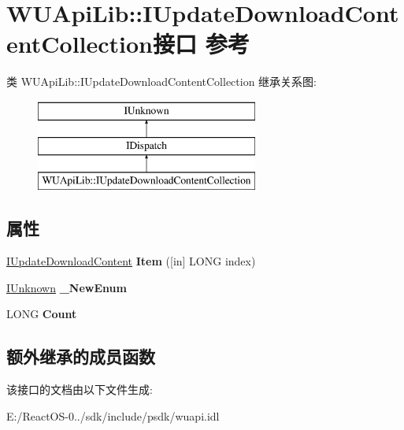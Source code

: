 \hypertarget{interface_w_u_api_lib_1_1_i_update_download_content_collection}{}\section{W\+U\+Api\+Lib\+:\+:I\+Update\+Download\+Content\+Collection接口 参考}
\label{interface_w_u_api_lib_1_1_i_update_download_content_collection}
类 W\+U\+Api\+Lib\+:\+:I\+Update\+Download\+Content\+Collection 继承关系图\+:\begin{figure}[H]
\begin{center}
\leavevmode
\includegraphics[height=3.000000cm]{interface_w_u_api_lib_1_1_i_update_download_content_collection}
\end{center}
\end{figure}
\subsection*{属性}
\begin{DoxyCompactItemize}
\item 
\mbox{\label{interface_w_u_api_lib_1_1_i_update_download_content_collection_a3d59c7eb3649060adbc671676b8494d0}} 
\hyperlink{interface_w_u_api_lib_1_1_i_update_download_content}{I\+Update\+Download\+Content} {\bfseries Item} (\mbox{[}in\mbox{]} L\+O\+NG index)
\item 
\mbox{\label{interface_w_u_api_lib_1_1_i_update_download_content_collection_ae13a8c972e077eda2e546d77e8f0e513}} 
\hyperlink{interface_i_unknown}{I\+Unknown} {\bfseries \+\_\+\+New\+Enum}
\item 
\mbox{\label{interface_w_u_api_lib_1_1_i_update_download_content_collection_a3785615f02e9e83e25cb952176f231d9}} 
L\+O\+NG {\bfseries Count}
\end{DoxyCompactItemize}
\subsection*{额外继承的成员函数}


该接口的文档由以下文件生成\+:\begin{DoxyCompactItemize}
\item 
E\+:/\+React\+O\+S-\/0../sdk/include/psdk/wuapi.\+idl\end{DoxyCompactItemize}

